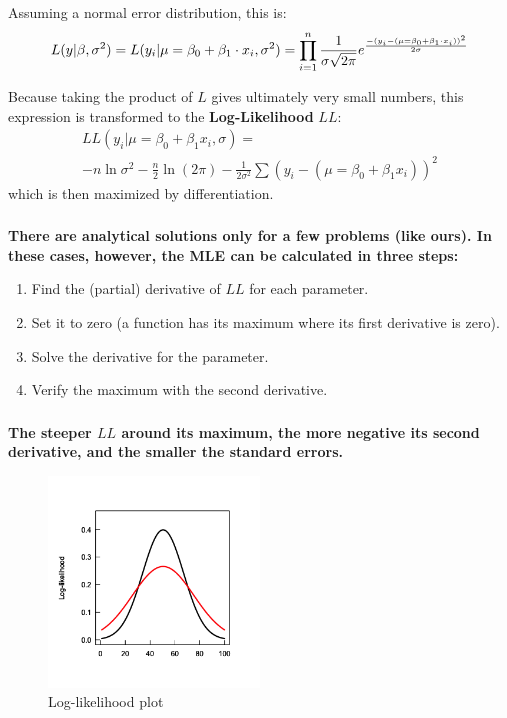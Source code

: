\documentclass{beamer}
\begin{document}
\begin{frame}
    \frametitle{}
    Assuming a normal error distribution, this is:
    \begin{equation*}
        \scriptsize{L( y | \beta, \sigma^2) = L(y_i|\mu = \beta_0 + \beta_1 \cdot x_i, \sigma^2) = \prod_{i=1}^n \frac{1}{\sigma \sqrt{2 \pi}} e^\frac{-(y_i - (\mu = \beta_0 + \beta_1 \cdot x_i))^2}{2 \sigma}}
    \end{equation*}
    \vspace{0.5cm}
    
    Because taking the product of $L$ gives ultimately very small numbers, this expression is transformed to the \textbf{Log-Likelihood} $LL$:
    \begin{multline*}
        LL(y_i | \mu = \beta_0 + \beta_1 x_i, \sigma) = \\
        -n \ln \sigma^2 - \frac n2 \ln (2 \pi) - \frac{1}{2 \sigma^2} \sum (y_i - (\mu = \beta_0 + \beta_1 x_i))^2    
    \end{multline*}
    which is then maximized by differentiation.
\end{frame}

\begin{frame}
    \frametitle{}
    \textbf{There are analytical solutions only for a few problems (like ours). In these cases, however, the MLE can be calculated in three steps:}
    \begin{enumerate}
        \item Find the (partial) derivative of $LL$ for each parameter.
        \item Set it to zero (a function has its maximum where its first derivative is zero).
        \item Solve the derivative for the parameter.
        \item Verify the maximum with the second derivative.
    \end{enumerate}
\end{frame}

\begin{frame}
    \frametitle{}
    \textbf{The steeper $LL$ around its maximum, the more negative its second derivative, and the smaller the standard errors.}
    
    \begin{figure}[h]
        \centering
        \includegraphics[width=0.5\textwidth]{lectures/day_2_LM_refresh_I/figures/unnamed-chunk-19-1.png} 
        \caption{Log-likelihood plot}
    \end{figure}
\end{frame}
\end{document}
